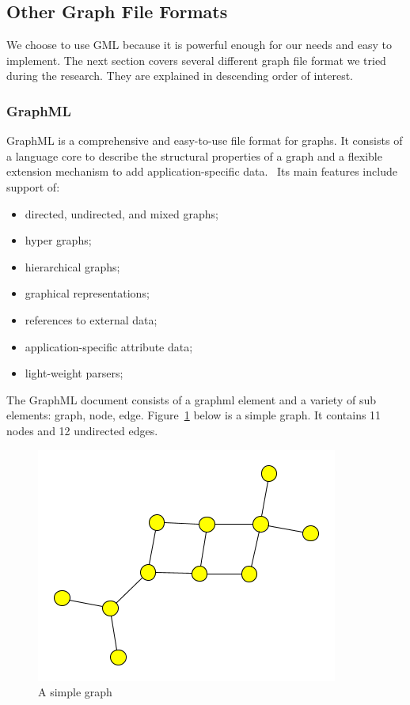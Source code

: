 \subsection{Other Graph File Formats}

We choose to use GML because it is powerful enough for our needs and easy to implement. The next section covers several different graph file format we tried during the research. They are explained in descending order of interest.

\subsubsection{GraphML}
GraphML is a comprehensive and easy-to-use file format for graphs. It consists of a language core to describe the structural properties of a graph and a flexible extension mechanism to add application-specific data.~\cite{GraphML} Its main features include support of:
\begin{itemize}
\item directed, undirected, and mixed graphs;
\item hyper graphs;
\item hierarchical graphs;
\item graphical representations;
\item references to external data;
\item application-specific attribute data;
\item light-weight parsers;
\end{itemize}

The GraphML document consists of a graphml element and a variety of sub elements: graph, node, edge. Figure~\ref{fig:simple_graphml} below is a simple graph. It contains 11 nodes and 12 undirected edges.

\begin{figure}[h!]
\centering
\includegraphics[scale=1.0]{pictures/simple.png}
\caption{A simple graph}
\label{fig:simple_graphml}
\end{figure}


